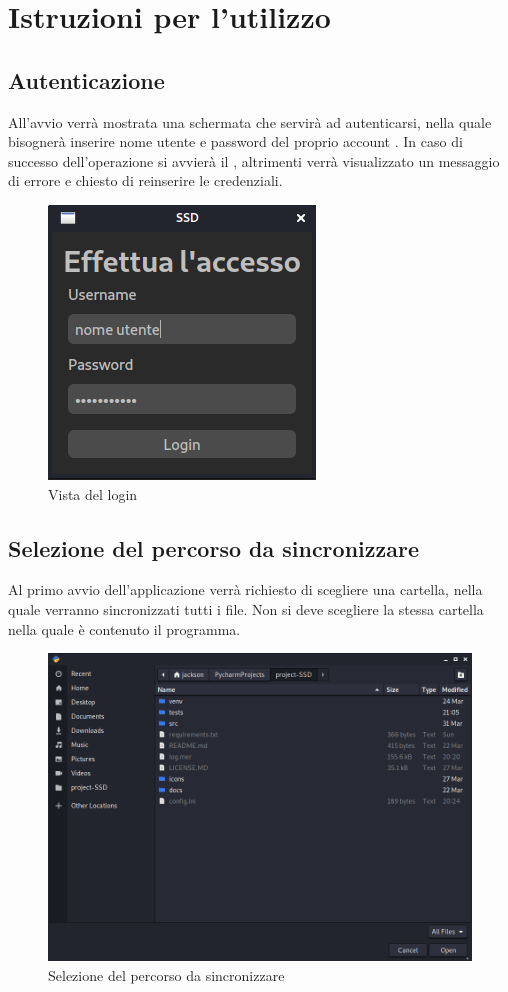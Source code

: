 \section{Istruzioni per l'utilizzo}
\subsection{Autenticazione}
All'avvio verrà mostrata una schermata che servirà ad autenticarsi, nella quale bisognerà inserire nome utente e password del proprio account . In caso di successo dell'operazione si avvierà il , altrimenti verrà visualizzato un messaggio di errore e chiesto di reinserire le credenziali.
\begin{figure}[H]
    \centering
    \includegraphics[scale = 0.50]{components/img/login.png}
    \caption{Vista del login}
    \label{fig:Vista del login}
\end{figure}
\subsection{Selezione del percorso da sincronizzare}
\label{sec:selezionepath}
Al primo avvio dell'applicazione verrà richiesto di scegliere una cartella, nella quale verranno sincronizzati tutti i file. Non si deve scegliere la stessa cartella nella quale è contenuto il programma.
\begin{figure}[H]
    \centering
    \includegraphics[scale = 0.30]{components/img/selezione-path.png}
    \caption{Selezione del percorso da sincronizzare}
    \label{fig:Selezione del percorso da sincronizzare}
\end{figure}

